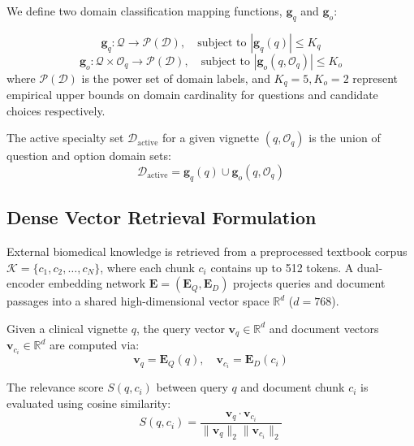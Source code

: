 We define two domain classification mapping functions, $\mathbf{g}_q$ and $\mathbf{g}_o$:

\begin{equation}
    \mathbf{g}_q: \mathcal{Q} \to \mathcal{P}(\mathcal{D}), \quad \text{subject to } |\mathbf{g}_q(q)| \le K_q
\end{equation}
\begin{equation}
    \mathbf{g}_o: \mathcal{Q} \times \mathcal{O}_q \to \mathcal{P}(\mathcal{D}), \quad \text{subject to } |\mathbf{g}_o(q, \mathcal{O}_q)| \le K_o
\end{equation}
where $\mathcal{P}(\mathcal{D})$ is the power set of domain labels, and $K_q = 5, K_o = 2$ represent empirical upper bounds on domain cardinality for questions and candidate choices respectively.

The active specialty set $\mathcal{D}_{\text{active}}$ for a given vignette $(q, \mathcal{O}_q)$ is the union of question and option domain sets:
\begin{equation}
    \mathcal{D}_{\text{active}} = \mathbf{g}_q(q) \cup \mathbf{g}_o(q, \mathcal{O}_q)
\end{equation}

\subsection{Dense Vector Retrieval Formulation}

External biomedical knowledge is retrieved from a preprocessed textbook corpus $\mathcal{K} = \{c_1, c_2, \dots, c_N\}$, where each chunk $c_i$ contains up to 512 tokens. A dual-encoder embedding network $\mathbf{E} = (\mathbf{E}_Q, \mathbf{E}_D)$ projects queries and document passages into a shared high-dimensional vector space $\mathbb{R}^d$ ($d=768$).

Given a clinical vignette $q$, the query vector $\mathbf{v}_q \in \mathbb{R}^d$ and document vectors $\mathbf{v}_{c_i} \in \mathbb{R}^d$ are computed via:
\begin{equation}
    \mathbf{v}_q = \mathbf{E}_Q(q), \quad \mathbf{v}_{c_i} = \mathbf{E}_D(c_i)
\end{equation}

The relevance score $S(q, c_i)$ between query $q$ and document chunk $c_i$ is evaluated using cosine similarity:
\begin{equation}
    S(q, c_i) = \frac{\mathbf{v}_q \cdot \mathbf{v}_{c_i}}{\|\mathbf{v}_q\|_2 \|\mathbf{v}_{c_i}\|_2}
\end{equation}

